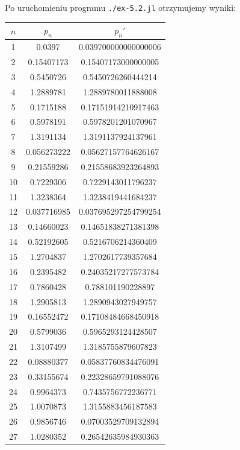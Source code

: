 \documentclass[10pt]{article}
\begin{document}
Po uruchomieniu programu \texttt{./ex-5.2.jl} otrzymujemy wyniki:
\begin{center}
    \begin{tabular}{|c| c c |}
        \hline
        $n$ & $p_n$ & $p_n'$\\
        \hline\hline
        1 & 0.0397 & 0.039700000000000006\\
        2 & 0.15407173 & 0.15407173000000005\\
        3 & 0.5450726 & 0.5450726260444214\\
        4 & 1.2889781 & 1.2889780011888008\\
        5 & 0.1715188 & 0.17151914210917463\\
        6 & 0.5978191 & 0.5978201201070967\\
        7 & 1.3191134 & 1.3191137924137961\\
        8 & 0.056273222 & 0.05627157764626167\\
        9 & 0.21559286 & 0.21558683923264893\\
        10 & 0.7229306 & 0.7229143011796237\\
        11 & 1.3238364 & 1.3238419441684237\\
        12 & 0.037716985 & 0.037695297254799254\\
        13 & 0.14660023 & 0.14651838271381398\\
        14 & 0.52192605 & 0.5216706214360409\\
        15 & 1.2704837 & 1.2702617739357684\\
        16 & 0.2395482 & 0.24035217277573784\\
        17 & 0.7860428 & 0.788101190228897\\
        18 & 1.2905813 & 1.2890943027949757\\
        19 & 0.16552472 & 0.17108484668450918\\
        20 & 0.5799036 & 0.5965293124428507\\
        21 & 1.3107499 & 1.3185755879607823\\
        22 & 0.08880377 & 0.05837760834476091\\
        23 & 0.33155674 & 0.22328659791088076\\
        24 & 0.9964373 & 0.7435756772236771\\
        25 & 1.0070873 & 1.3155883456187583\\
        26 & 0.9856746 & 0.07003529709132894\\
        27 & 1.0280352 & 0.26542635984930363\\

\end{tabular}
\end{center}
\end{document}
